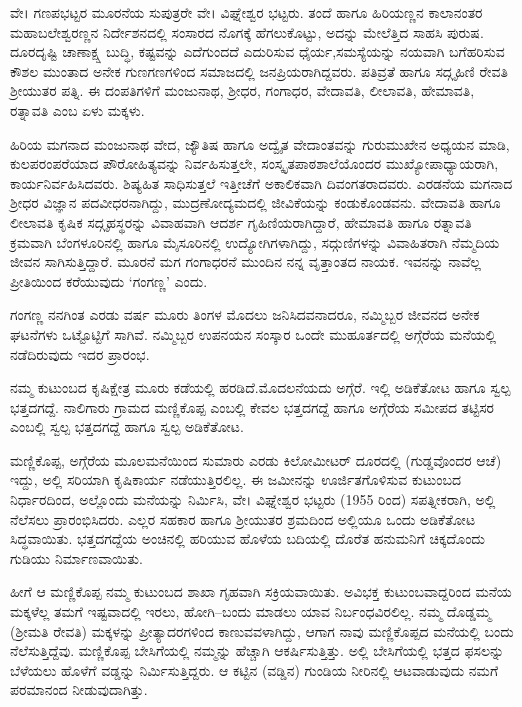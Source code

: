 ವೇ। ಗಣಪಭಟ್ಟರ ಮೂರನೆಯ ಸುಪುತ್ರರೇ ವೇ। ವಿಘ್ನೇಶ್ವರ ಭಟ್ಟರು. ತಂದೆ ಹಾಗೂ ಹಿರಿಯಣ್ಣನ ಕಾಲಾನಂತರ ಮಹಾಬಲೇಶ್ವರಣ್ಣನ ನಿರ್ದೇಶನದಲ್ಲಿ ಸಂಸಾರದ ನೊಗಕ್ಕೆ ಹೆಗಲುಕೊಟ್ಟು, ಅದನ್ನು ಮೇಲೆತ್ತಿದ ಸಾಹಸಿ ಪುರುಷ. ದೂರದೃಷ್ಟಿ ಚಾಣಾಕ್ಷ್ಷ ಬುದ್ಧಿ, ಕಷ್ಟವನ್ನು ಎದೆಗುಂದದೆ ಎದುರಿಸುವ ಧೈರ್ಯ,ಸಮಸ್ಯೆಯನ್ನು ನಯವಾಗಿ ಬಗೆಹರಿಸುವ ಕೌಶಲ ಮುಂತಾದ ಅನೇಕ ಗುಣಗಣಗಳಿಂದ ಸಮಾಜದಲ್ಲಿ ಜನಪ್ರಿಯರಾಗಿದ್ದವರು. ಪತಿವ್ರತೆ ಹಾಗೂ ಸದ್ಗೃಹಿಣಿ ರೇವತಿ ಶ್ರೀಯುತರ ಪತ್ನಿ. ಈ ದಂಪತಿಗಳಿಗೆ ಮಂಜುನಾಥ, ಶ್ರೀಧರ, ಗಂಗಾಧರ, ವೇದಾವತಿ, ಲೀಲಾವತಿ, ಹೇಮಾವತಿ, ರತ್ನಾವತಿ ಎಂಬ ಏಳು ಮಕ್ಕಳು.

ಹಿರಿಯ ಮಗನಾದ ಮಂಜುನಾಥ ವೇದ, ಜ್ಯೌತಿಷ ಹಾಗೂ ಅದ್ವೈತ ವೇದಾಂತವನ್ನು ಗುರುಮುಖೇನ ಅಧ್ಯಯನ ಮಾಡಿ, ಕುಲಪರಂಪರೆಯಾದ ಪೌರೋಹಿತ್ಯವನ್ನು ನಿರ್ವಹಿಸುತ್ತಲೇ, ಸಂಸ್ಕೃತಪಾಠಶಾಲೆಯೊಂದರ ಮುಖ್ಯೋಪಾಧ್ಯಾಯರಾಗಿ, ಕಾರ್ಯನಿರ್ವಹಿಸಿದವರು. ಶಿಷ್ಯಹಿತ ಸಾಧಿಸುತ್ತಲೆ ಇತ್ತೀಚೆಗೆ ಅಕಾಲಿಕವಾಗಿ ದಿವಂಗತರಾದವರು. ಎರಡನೆಯ ಮಗನಾದ ಶ್ರೀಧರ ವಿಜ್ಞಾನ ಪದವೀಧರನಾಗಿದ್ದು, ಮುದ್ರಣೋದ್ಯಮದಲ್ಲಿ ಜೀವಿಕೆಯನ್ನು ಕಂಡುಕೊಂಡವನು. ವೇದಾವತಿ ಹಾಗೂ ಲೀಲಾವತಿ ಕೃಷಿಕ ಸದ್ಗೃಹಸ್ಥರನ್ನು ವಿವಾಹವಾಗಿ ಆದರ್ಶ ಗೃಹಿಣಿಯರಾಗಿದ್ದಾರೆ, ಹೇಮಾವತಿ ಹಾಗೂ ರತ್ನಾವತಿ ಕ್ರಮವಾಗಿ ಬೆಂಗಳೂರಿನಲ್ಲಿ ಹಾಗೂ ಮೈಸೂರಿನಲ್ಲಿ ಉದ್ಯೋಗಿಗಳಾಗಿದ್ದು, ಸದ್ಗುಣಿಗಳನ್ನು ವಿವಾಹಿತರಾಗಿ ನೆಮ್ಮದಿಯ ಜೀವನ ಸಾಗಿಸುತ್ತಿದ್ದಾರೆ. ಮೂರನೆ ಮಗ ಗಂಗಾಧರನೆ ಮುಂದಿನ ನನ್ನ ವೃತ್ತಾಂತದ ನಾಯಕ. ಇವನನ್ನು ನಾವೆಲ್ಲ ಪ್ರೀತಿಯಿಂದ ಕರೆಯುವುದು ‘ಗಂಗಣ್ಣ’ ಎಂದು.

ಗಂಗಣ್ಣ ನನಗಿಂತ ಎರಡು ವರ್ಷ ಮೂರು ತಿಂಗಳ ಮೊದಲು ಜನಿಸಿದವನಾದರೂ, ನಮ್ಮಿಬ್ಬರ ಜೀವನದ ಅನೇಕ ಘಟನೆಗಳು ಒಟ್ಟೊಟ್ಟಿಗೆ ಸಾಗಿವೆ. ನಮ್ಮಿಬ್ಬರ ಉಪನಯನ ಸಂಸ್ಕಾರ ಒಂದೇ ಮುಹೂರ್ತದಲ್ಲಿ ಅಗ್ಗೆರೆಯ ಮನೆಯಲ್ಲಿ ನಡೆದಿರುವುದು ಇದರ ಪ್ರಾರಂಭ.

ನಮ್ಮ ಕುಟುಂಬದ  ಕೃಷಿಕ್ಷೇತ್ರ ಮೂರು ಕಡೆಯಲ್ಲಿ ಹರಡಿದೆ.ಮೊದಲನೆಯದು ಅಗ್ಗೆರೆ. ಇಲ್ಲಿ ಅಡಿಕೆತೋಟ ಹಾಗೂ ಸ್ವಲ್ಪ ಭತ್ತದಗದ್ದೆ. ನಾಲಿಗಾರು ಗ್ರಾಮದ ಮಣ್ಣಿಕೊಪ್ಪ ಎಂಬಲ್ಲಿ ಕೇವಲ ಭತ್ತದಗದ್ದೆ ಹಾಗೂ ಅಗ್ಗೆರೆಯ ಸಮೀಪದ ತಟ್ಟಿಸರ ಎಂಬಲ್ಲಿ ಸ್ವಲ್ಪ ಭತ್ತದಗದ್ದೆ ಹಾಗೂ ಸ್ವಲ್ಪ ಅಡಿಕೆತೋಟ.

ಮಣ್ಣಿಕೊಪ್ಪ, ಅಗ್ಗೆರೆಯ ಮೂಲಮನೆಯಿಂದ ಸುಮಾರು ಎರಡು ಕಿಲೋಮೀಟರ್ ದೂರದಲ್ಲಿ (ಗುಡ್ಡವೊಂದರ ಆಚೆ) ಇದ್ದು, ಅಲ್ಲಿ ಸರಿಯಾಗಿ ಕೃಷಿಕಾರ್ಯ ನಡೆಯುತ್ತಿರಲಿಲ್ಲ. ಈ ಜಮೀನನ್ನು ಊರ್ಜಿತಗೊಳಿಸುವ ಕುಟುಂಬದ ನಿರ್ಧಾರದಿಂದ, ಅಲ್ಲೊಂದು ಮನೆಯನ್ನು ನಿರ್ಮಿಸಿ, ವೇ। ವಿಘ್ನೇಶ್ವರ ಭಟ್ಟರು (1955 ರಿಂದ) ಸಪತ್ನೀಕರಾಗಿ, ಅಲ್ಲಿ ನೆಲೆಸಲು ಪ್ರಾರಂಭಿಸಿದರು. ಎಲ್ಲರ ಸಹಕಾರ ಹಾಗೂ ಶ್ರೀಯುತರ ಶ್ರಮದಿಂದ ಅಲ್ಲಿಯೂ ಒಂದು ಅಡಿಕೆತೋಟ ಸಿದ್ಧವಾಯಿತು. ಭತ್ತದಗದ್ದೆಯ ಅಂಚಿನಲ್ಲಿ ಹರಿಯುವ ಹೊಳೆಯ ಬದಿಯಲ್ಲಿ ದೊರೆತ ಹನುಮನಿಗೆ ಚಿಕ್ಕದೊಂದು  ಗುಡಿಯು ನಿರ್ಮಾಣವಾಯಿತು. 

ಹೀಗೆ ಆ ಮಣ್ಣಿಕೊಪ್ಪ ನಮ್ಮ ಕುಟುಂಬದ ಶಾಖಾ ಗೃಹವಾಗಿ ಸಕ್ರಿಯವಾಯಿತು. ಅವಿಭಕ್ತ ಕುಟುಂಬವಾದ್ದರಿಂದ ಮನೆಯ ಮಕ್ಕಳೆಲ್ಲ ತಮಗೆ ಇಷ್ಟವಾದಲ್ಲಿ ಇರಲು, ಹೋಗಿ–ಬಂದು ಮಾಡಲು ಯಾವ ನಿರ್ಬಂಧವಿರಲಿಲ್ಲ.  ನಮ್ಮ ದೊಡ್ಡಮ್ಮ (ಶ್ರೀಮತಿ ರೇವತಿ) ಮಕ್ಕಳನ್ನು ಪ್ರೀತ್ಯಾದರಗಳಿಂದ ಕಾಣುವವಳಾಗಿದ್ದು, ಆಗಾಗ ನಾವು ಮಣ್ಣಿಕೊಪ್ಪದ ಮನೆಯಲ್ಲಿ ಬಂದು ನೆಲೆಸುತ್ತಿದ್ದೆವು. ಮಣ್ಣಿಕೊಪ್ಪ ಬೇಸಿಗೆಯಲ್ಲಿ ನಮ್ಮನ್ನು ಹೆಚ್ಚಾಗಿ ಆಕರ್ಷಿಸುತ್ತಿತ್ತು. ಅಲ್ಲಿ ಬೇಸಿಗೆಯಲ್ಲಿ ಭತ್ತದ ಫಸಲನ್ನು ಬೆಳೆಯಲು ಹೊಳೆಗೆ ವಡ್ಡನ್ನು ನಿರ್ಮಿಸುತ್ತಿದ್ದರು. ಆ ಕಟ್ಟಿನ (ವಡ್ಡಿನ) ಗುಂಡಿಯ ನೀರಿನಲ್ಲಿ ಆಟವಾಡುವುದು ನಮಗೆ ಪರಮಾನಂದ ನೀಡುವುದಾಗಿತ್ತು.


